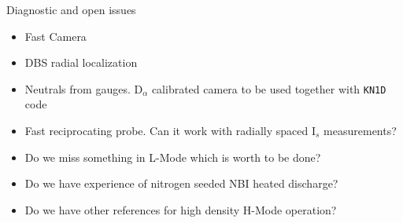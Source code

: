 \documentclass[10pt, compress]{beamer}
\newcommand\Fontvi{\fontsize{8}{7.2}\selectfont}
\begin{document}
        \begin{frame}{Diagnostic and open issues}
          \begin{itemize}
          \item Fast Camera
          \item DBS radial localization
          \item Neutrals from gauges. D$_{\alpha}$ calibrated camera
            to be used together with \texttt{KN1D} code
          \item Fast reciprocating probe. Can it work with radially
            spaced I$_s$ measurements?
          \item Do we miss something in L-Mode which is worth to be
            done?
          \item Do we have experience of nitrogen seeded NBI heated
            discharge?
          \item Do we have other references for high density H-Mode operation?
          \end{itemize}
        \end{frame}
\end{document}
